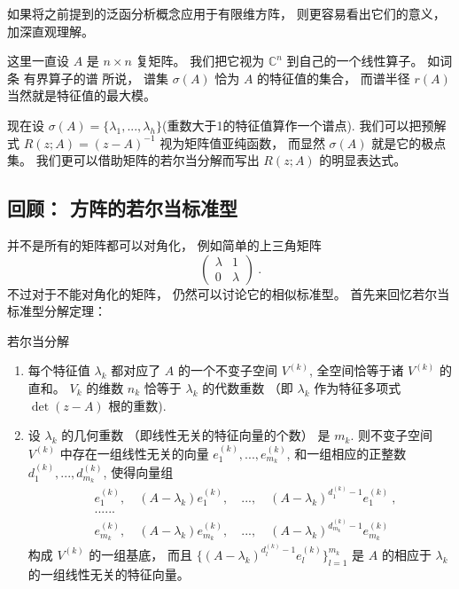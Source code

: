 

如果将之前提到的泛函分析概念应用于有限维方阵， 则更容易看出它们的意义， 加深直观理解。 

这里一直设 $A$ 是 $n\times n$ 复矩阵。 我们把它视为 $\mathbb{C}^n$ 到自己的一个线性算子。 如词条 有界算子的谱 所说， 谱集 $\sigma(A)$ 恰为 $A$ 的特征值的集合， 而谱半径 $r(A)$ 当然就是特征值的最大模。 

现在设 $\sigma(A)=\{\lambda_1,...,\lambda_h\}$(重数大于1的特征值算作一个谱点). 我们可以把预解式 $R(z;A)=(z-A)^{-1}$ 视为矩阵值亚纯函数， 而显然 $\sigma(A)$ 就是它的极点集。 我们更可以借助矩阵的若尔当分解而写出 $R(z;A)$ 的明显表达式。 

\subsection{回顾： 方阵的若尔当标准型}
并不是所有的矩阵都可以对角化， 例如简单的上三角矩阵
$$
\left(
\begin{matrix}
\lambda & 1 \\
0 & \lambda
\end{matrix}
\right)~.
$$
不过对于不能对角化的矩阵， 仍然可以讨论它的相似标准型。 首先来回忆若尔当标准型分解定理：

\begin{theorem}{若尔当分解}
\begin{enumerate}
\item 每个特征值 $\lambda_k$ 都对应了 $A$ 的一个不变子空间 $V^{(k)}$, 全空间恰等于诸 $V^{(k)}$ 的直和。 $V_k$ 的维数 $n_k$ 恰等于 $\lambda_k$ 的代数重数 （即 $\lambda_k$ 作为特征多项式 $\det(z-A)$ 根的重数).
\item 设 $\lambda_k$ 的几何重数 （即线性无关的特征向量的个数） 是 $m_k$. 则不变子空间 $V^{(k)}$ 中存在一组线性无关的向量 $e^{(k)}_1,...,e^{(k)}_{m_k}$, 和一组相应的正整数 $d^{(k)}_1,...,d^{(k)}_{m_k}$, 使得向量组
$$
\begin{aligned}
&e^{(k)}_1,\quad(A-\lambda_k)e^{(k)}_1,\quad...,\quad(A-\lambda_k)^{d^{(k)}_1-1}e^{(k)}_1~,\\
&......\\
&e^{(k)}_{m_k},\quad(A-\lambda_k)e^{(k)}_{m_k},\quad...,\quad(A-\lambda_k)^{d^{(k)}_{m_k}-1}e^{(k)}_{m_k}~
\end{aligned}
$$
构成 $V^{(k)}$ 的一组基底， 而且 $\{(A-\lambda_k)^{d^{(k)}_l-1}e^{(k)}_l\}_{l=1}^{m_k}$ 是 $A$ 的相应于 $\lambda_k$ 的一组线性无关的特征向量。
\end{enumerate}
\end{theorem}

